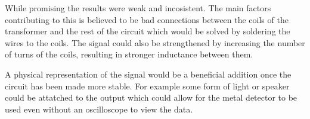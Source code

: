 % 
While promising the results were weak and incosistent. The main factors contributing to this is believed to be bad connections between the 
coils of the transformer and the rest of the circuit which would be solved by soldering the wires to the coils. The signal could also be 
strengthened by increasing the number of turns of the coils, resulting in stronger inductance between them. 

A physical representation of the signal would be a beneficial addition once the circuit has been made more stable. For example some form of 
light or speaker could be attatched to the output which could allow for the metal detector to be used even without an oscilloscope to 
view the data.